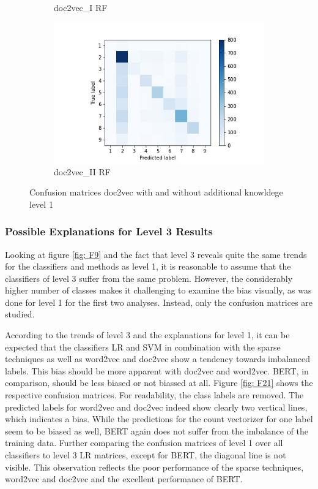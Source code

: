\documentclass[12pt, a4paper, titlepage]{article}
\begin{document}
\begin{figure}
\begin{subfigure}[b]{0.475\textwidth}
    {{\small doc2vec\_I RF}}    
  \end{subfigure}
  \hfill
  \begin{subfigure}[b]{0.475\textwidth}   
      \centering 
      \includegraphics[width=\textwidth]{cm_doc2vec_with_RF.jpg}
      {{\small doc2vec\_II RF}}    
  \end{subfigure}
  \caption{\label{fig: F24} Confusion matrices doc2vec with and without additional knowldege level 1}
\end{figure}


\subsubsection*{Possible Explanations for Level 3 Results}
Looking at figure \ref{fig: F9} and the fact that level 3 reveals quite the same trends for the classifiers and methods as level 1, it is reasonable to assume that the classifiers of level 3 suffer from the same problem. However, the considerably higher number of classes makes it challenging to examine the bias visually, as was done for level 1 for the first two analyses. Instead, only the confusion matrices are studied.

According to the trends of level 3 and the explanations for level 1, it can be expected that the classifiers \ac{LR} and \ac{SVM} in combination with the sparse techniques as well as word2vec and doc2vec show a tendency towards imbalanced labels. This bias should be more apparent with doc2vec and word2vec. \ac{BERT}, in comparison, should be less biased or not biassed at all. Figure \ref{fig: F21} shows the respective confusion matrices. For readability, the class labels are removed. The predicted labels for word2vec and doc2vec indeed show clearly two vertical lines, which indicates a bias. While the predictions for the count vectorizer for one label seem to be biased as well, \ac{BERT} again does not suffer from the imbalance of the training data. Further comparing the confusion matrices of level 1 over all classifiers to level 3 \ac{LR} matrices, except for \ac{BERT}, the diagonal line is not visible. This observation reflects the poor performance of the sparse techniques, word2vec and doc2vec and the excellent performance of \ac{BERT}.  
\end{document}
